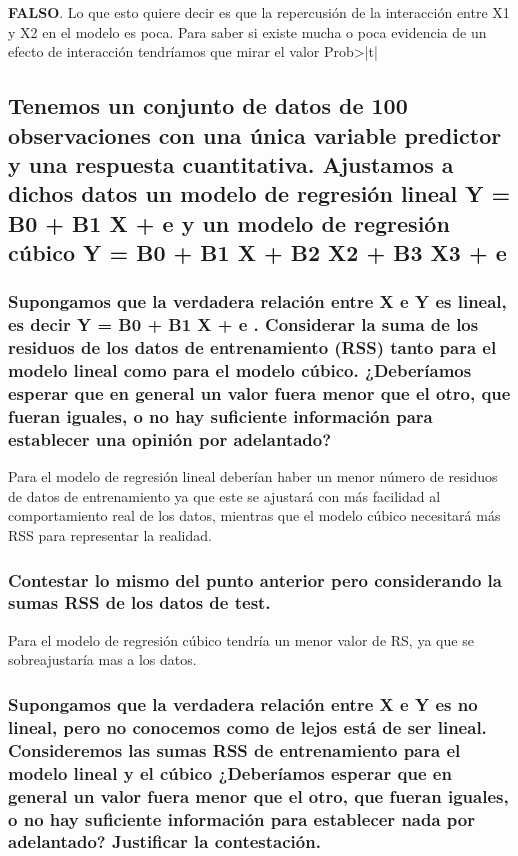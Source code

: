 \textbf{FALSO}. Lo que esto quiere decir es que la repercusión de la interacción entre X1 y X2 en el modelo es poca. Para saber si existe mucha o poca evidencia de un efecto de interacción tendríamos que mirar el valor Prob>|t|


\subsection{Tenemos un conjunto de datos de 100 observaciones con una única variable predictor y una respuesta cuantitativa. Ajustamos a dichos datos un modelo de regresión lineal Y = B0 + B1 X + e y un modelo de regresión cúbico Y = B0 + B1 X + B2 X2 + B3 X3 + e}


\subsubsection{Supongamos que la verdadera relación entre X e Y es lineal, es decir Y = B0 + B1 X + e . Considerar la suma de los residuos de los datos de entrenamiento (RSS) tanto para el modelo lineal como para el modelo cúbico. ¿Deberíamos esperar que en general un valor fuera menor que el otro, que fueran iguales, o no hay suficiente información para establecer una opinión por adelantado?}

Para el modelo de regresión lineal deberían haber un menor número de residuos de datos de entrenamiento ya que este se ajustará con más facilidad al comportamiento real de los datos, mientras que el modelo cúbico necesitará más RSS para representar la realidad.

\subsubsection{Contestar lo mismo del punto anterior pero considerando la sumas RSS de los datos de test.}

Para el modelo de regresión cúbico tendría un menor valor de RS,  ya que se sobreajustaría mas a los datos.

\subsubsection{Supongamos que la verdadera relación entre X e Y es no lineal, pero no conocemos como de lejos está de ser lineal. Consideremos las sumas RSS de entrenamiento para el modelo lineal y el cúbico ¿Deberíamos esperar que en general un valor fuera menor que el otro, que fueran iguales, o no hay suficiente información para establecer nada por adelantado? Justificar la contestación.}

